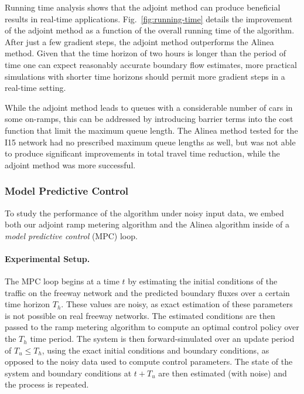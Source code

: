 Running time analysis shows that the adjoint method can produce beneficial
results in real-time applications. Fig.~\ref{fig:running-time} details the improvement of the adjoint method as a function of the overall running time of the algorithm. After just a few gradient steps, the
adjoint method outperforms the Alinea method. Given that the time
horizon of two hours is longer than the period of time one can expect
reasonably accurate boundary flow estimates, more practical simulations
with shorter time horizons should permit more gradient steps in a
real-time setting.
								
While the adjoint method leads to queues with a considerable number of cars in some on-ramps, this can be addressed by introducing barrier terms into the cost function that limit the
maximum queue length. The Alinea method tested for the I15 network
had no prescribed maximum queue lengths as well, but was not able
to produce significant improvements in total travel time reduction, while the adjoint method was
more successful.
								
								
\subsubsection{Model Predictive Control\label{sub:Model-predictive-control}}
								
To study the performance of the algorithm under noisy input data,
we embed both our adjoint ramp metering algorithm and the Alinea algorithm
inside of a \emph{model predictive control} (MPC) loop.
								
								
\paragraph{Experimental Setup.}
								
The MPC loop begins at a time $t$ by estimating the initial conditions
of the traffic on the freeway network and the predicted boundary fluxes
over a certain time horizon $T_{h}$. These values are noisy, as exact
estimation of these parameters is not possible on real freeway networks.
The estimated conditions are then passed to the ramp metering algorithm
to compute an optimal control policy over the $T_{h}$ time period.
The system is then forward-simulated over an update period of $T_{u}\le T_{h}$,
using the exact initial conditions and boundary conditions, as opposed
to the noisy data used to compute control parameters. The state of
the system and boundary conditions at $t+T_{u}$ are then estimated
(with noise) and the process is repeated.
								
